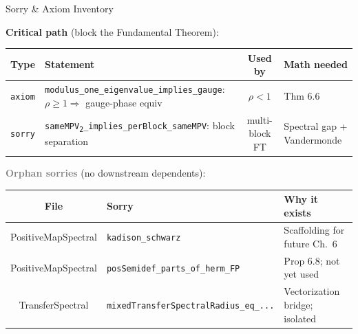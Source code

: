 \documentclass[aspectratio=169,10pt]{beamer}
\begin{document}
\begin{frame}{Sorry \& Axiom Inventory}
    \vspace{-0.5em}

    \textbf{\textcolor{softred}{Critical path}} (block the Fundamental Theorem):
    \vspace{-0.3em}
    {\scriptsize
        \begin{tabular}{@{}cp{5.0cm}cp{3.5cm}@{}}
            \toprule
            \textbf{Type} & \textbf{Statement} & \textbf{Used by} & \textbf{Math needed} \\
            \midrule
            \rowcolor{cardbg}
            \texttt{axiom} &
                \texttt{modulus\_one\_eigenvalue\_implies\_gauge}:
                $\rho \geq 1 \Rightarrow$ gauge-phase equiv &
                $\rho < 1$ &
                \cite{Wolf2012Quantum} Thm 6.6 \\
            \texttt{sorry} &
                \texttt{sameMPV\textsubscript{2}\_implies\_perBlock\_sameMPV}:
                block separation &
                multi-block FT &
                Spectral gap + Vandermonde \\
            \bottomrule
        \end{tabular}
    }

    \vspace{0.4em}
    \textbf{\textcolor{gray}{Orphan sorries}} (no downstream dependents):
    \vspace{-0.3em}
    {\scriptsize
        \begin{tabular}{@{}cp{5.0cm}p{4.5cm}@{}}
            \toprule
            \textbf{File} & \textbf{Sorry} & \textbf{Why it exists} \\
            \midrule
            \rowcolor{cardbg}
            PositiveMapSpectral &
                \texttt{kadison\_schwarz} &
                Scaffolding for future \cite{Wolf2012Quantum} Ch.~6 \\
            PositiveMapSpectral &
                \texttt{posSemidef\_parts\_of\_herm\_FP} &
                \cite{Wolf2012Quantum} Prop 6.8; not yet used \\
            \rowcolor{cardbg}
            TransferSpectral &
                \texttt{mixedTransferSpectralRadius\_eq\_...} &
                Vectorization bridge; isolated \\
            \bottomrule
        \end{tabular}
    }


\end{frame}
\end{document}
